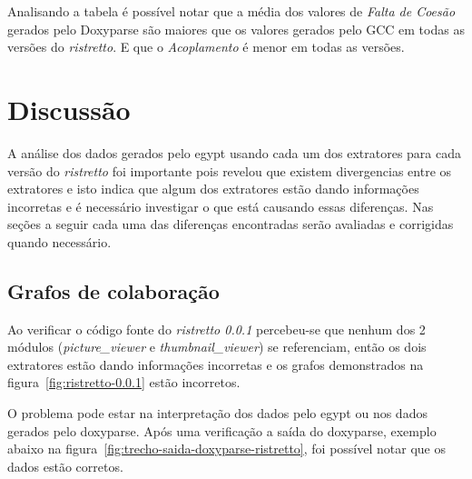 Analisando a tabela é possível notar que a média dos valores de {\it Falta de
Coesão} gerados pelo Doxyparse são maiores que os valores gerados pelo GCC em
todas as versões do {\it ristretto}. E que o {\it Acoplamento} é menor em todas
as versões.

\section{Discussão} \label{sec:discussao}

A análise dos dados gerados pelo egypt usando cada um dos extratores para cada
versão do {\it ristretto} foi importante pois revelou que existem divergencias
entre os extratores e isto indica que algum dos extratores estão dando
informações incorretas e é necessário investigar o que está causando essas
diferenças. Nas seções a seguir cada uma das diferenças encontradas serão
avaliadas e corrigidas quando necessário.

\subsection{Grafos de colaboração}

Ao verificar o código fonte do {\it ristretto 0.0.1} percebeu-se que nenhum dos
2 módulos ({\it picture\_viewer} e {\it thumbnail\_viewer}) se referenciam,
então os dois extratores estão dando informações incorretas e os grafos
demonstrados na figura~\ref{fig:ristretto-0.0.1} estão incorretos.

O problema pode estar na interpretação dos dados pelo egypt ou nos dados
gerados pelo doxyparse. Após uma verificação a saída do doxyparse, exemplo
abaixo na figura~\ref{fig:trecho-saida-doxyparse-ristretto}, foi possível notar
que os dados estão corretos.


